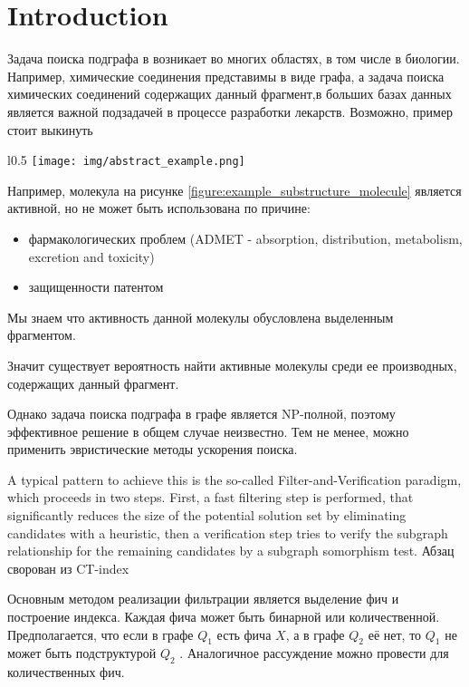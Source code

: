 \section{Introduction}

Задача поиска подграфа в возникает во многих областях, в том числе в биологии. Например, химические соединения представимы в виде графа, а задача поиска химических соединений содержащих данный фрагмент,в больших базах данных является важной подзадачей в процессе разработки лекарств.
{\color{red} Возможно, пример стоит выкинуть}
{

\begin{wrapfigure}{l}{0.5\textwidth}
    \texttt{[image: img/abstract\_example.png]}
    \caption{Пример молекулы и её подструктуры}
    \label{figure:example_substructure_molecule}
\end{wrapfigure}

Например, молекула на рисунке \ref{figure:example_substructure_molecule} является активной, но не может быть использована по причине:
\begin{itemize}
  \item фармакологических проблем (ADMET - absorption, distribution, metabolism, excretion and toxicity)
  \item защищенности патентом
\end{itemize}

Мы знаем что активность данной молекулы обусловлена выделенным фрагментом.

Значит существует вероятность найти активные молекулы среди ее производных, содержащих данный фрагмент.

}

\hfill

Однако задача поиска подграфа в графе является NP-полной, поэтому эффективное решение в общем случае неизвестно. Тем не менее, можно применить эвристические методы ускорения поиска.

A typical pattern to achieve this is the so-called Filter-and-Verification paradigm, which proceeds in two steps. First, a fast filtering step is performed, that significantly reduces the size of the potential solution set by eliminating candidates with a heuristic, then a verification step tries to verify the subgraph relationship for the remaining candidates by a subgraph somorphism test. {\color{red}Абзац сворован из CT-index}

Основным методом реализации фильтрации является выделение фич и построение индекса. Каждая фича может быть бинарной или количественной. Предполагается, что если в графе $Q_1$ есть фича $X $, а в графе $Q_2$ её нет, то $Q_1$ не может быть подструктурой $Q_2$ . Аналогичное рассуждение можно провести для количественных фич. 

